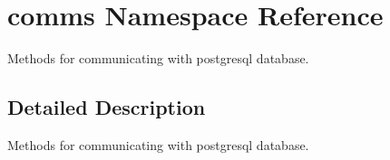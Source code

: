 \hypertarget{namespacecomms}{}\section{comms Namespace Reference}
\label{namespacecomms}


Methods for communicating with postgresql database.  




\subsection{Detailed Description}
Methods for communicating with postgresql database. 

